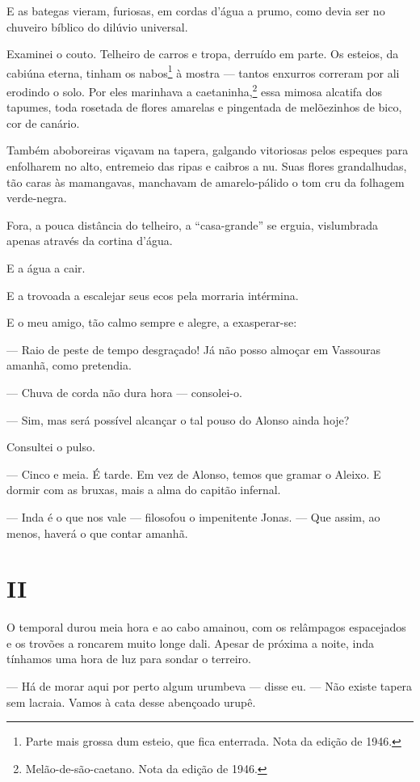 E as bategas vieram, furiosas, em cordas d'água a prumo, como devia ser
no chuveiro bíblico do dilúvio universal.

Examinei o couto. Telheiro de carros e tropa, derruído em parte. Os
esteios, da cabiúna eterna, tinham os nabos\footnote{Parte mais grossa
  dum esteio, que fica enterrada. Nota da edição de 1946.} à mostra ---
tantos enxurros correram por ali erodindo o solo. Por eles marinhava a
caetaninha,\footnote{Melão-de-são-caetano. Nota da edição de 1946.} essa
mimosa alcatifa dos tapumes, toda rosetada de flores amarelas e
pingentada de melõezinhos de bico, cor de canário.

Também aboboreiras viçavam na tapera, galgando vitoriosas pelos espeques
para enfolharem no alto, entremeio das ripas e caibros a nu. Suas flores
grandalhudas, tão caras às mamangavas, manchavam de amarelo-pálido o tom
cru da folhagem verde-negra.

Fora, a pouca distância do telheiro, a ``casa-grande'' se erguia,
vislumbrada apenas através da cortina d'água.

E a água a cair.

E a trovoada a escalejar seus ecos pela morraria intérmina.

E o meu amigo, tão calmo sempre e alegre, a exasperar-se:

--- Raio de peste de tempo desgraçado! Já não posso almoçar em Vassouras
amanhã, como pretendia.

--- Chuva de corda não dura hora --- consolei-o.

--- Sim, mas será possível alcançar o tal pouso do Alonso ainda hoje?

Consultei o pulso.

--- Cinco e meia. É tarde. Em vez de Alonso, temos que gramar o Aleixo.
E dormir com as bruxas, mais a alma do capitão infernal.

--- Inda é o que nos vale --- filosofou o impenitente Jonas. --- Que
assim, ao menos, haverá o que contar amanhã.

\section{II}

O temporal durou meia hora e ao cabo amainou, com os relâmpagos
espacejados e os trovões a roncarem muito longe dali. Apesar de próxima
a noite, inda tínhamos uma hora de luz para sondar o terreiro.

--- Há de morar aqui por perto algum urumbeva --- disse eu. --- Não
existe tapera sem lacraia. Vamos à cata desse abençoado urupê.

